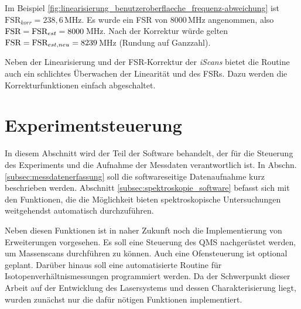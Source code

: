 Im Beispiel \ref{fig:linearisierung_benutzeroberflaeche_frequenz-abweichung}
ist $\text{FSR}_{korr}=238,6\,$MHz. Es wurde ein FSR von $8000\,$MHz angenommen,
also $\text{\lstinline|FSR|}=\text{FSR}_{est}=8000\,$MHz. Nach der Korrektur
würde gelten $\text{\lstinline|FSR|}=\text{FSR}_{est,neu}=8239\,$MHz
(Rundung auf Ganzzahl).\par
Neben der Linearisierung und der FSR-Korrektur der
\textit{iScans} bietet die Routine auch ein schlichtes Überwachen der Linearität
und des FSRs. Dazu werden die Korrekturfunktionen einfach abgeschaltet.

\section{Experimentsteuerung}\label{sec:experimentsteuerung}
In diesem Abschnitt wird der Teil der Software behandelt, der für die Steuerung
des Experiments und die Aufnahme der Messdaten verantwortlich ist. In Abschn.
\ref{subsec:messdatenerfassung} soll die softwareseitige Datenaufnahme kurz
beschrieben werden. Abschnitt \ref{subsec:spektroskopie_software} befasst sich mit den
Funktionen, die die Möglichkeit bieten spektroskopische Untersuchungen
weitgehendst automatisch durchzuführen.\par
Neben diesen Funktionen ist in naher Zukunft noch die Implementierung von
Erweiterungen vorgesehen. Es soll eine Steuerung des QMS nachgerüstet werden, um
Massenscans durchführen zu können. Auch eine Ofensteuerung ist optional geplant.
Darüber hinaus soll eine automatisierte Routine für Isotopenverhältnismessungen
programmiert werden. Da der Schwerpunkt dieser Arbeit auf der Entwicklung des
Lasersystems und dessen Charakterisierung liegt, wurden zunächst nur die dafür
nötigen Funktionen implementiert.


